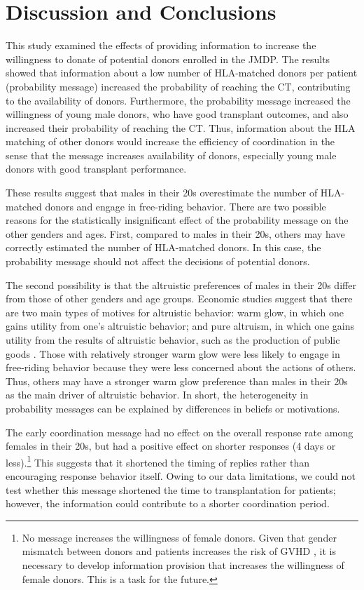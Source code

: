 \documentclass[12pt, a4paper]{article}
\begin{document}
\hypertarget{conclusion}{%
\section{Discussion and Conclusions}\label{conclusion}}

This study examined the effects of providing information to increase the willingness to donate of potential donors enrolled in the JMDP. The results showed that information about a low number of HLA-matched donors per patient (probability message) increased the probability of reaching the CT, contributing to the availability of donors. Furthermore, the probability message increased the willingness of young male donors, who have good transplant outcomes, and also increased their probability of reaching the CT. Thus, information about the HLA matching of other donors would increase the efficiency of coordination in the sense that the message increases availability of donors, especially young male donors with good transplant performance.

These results suggest that males in their 20s overestimate the number of HLA-matched donors and engage in free-riding behavior. There are two possible reasons for the statistically insignificant effect of the probability message on the other genders and ages. First, compared to males in their 20s, others may have correctly estimated the number of HLA-matched donors. In this case, the probability message should not affect the decisions of potential donors.

The second possibility is that the altruistic preferences of males in their 20s differ from those of other genders and age groups. Economic studies suggest that there are two main types of motives for altruistic behavior: warm glow, in which one gains utility from one's altruistic behavior; and pure altruism, in which one gains utility from the results of altruistic behavior, such as the production of public goods \citep{Andreoni1990}. Those with relatively stronger warm glow were less likely to engage in free-riding behavior because they were less concerned about the actions of others. Thus, others may have a stronger warm glow preference than males in their 20s as the main driver of altruistic behavior. In short, the heterogeneity in probability messages can be explained by differences in beliefs or motivations.

The early coordination message had no effect on the overall response rate among females in their 20s, but had a positive effect on shorter responses (4 days or less).\footnote{No message increases the willingness of female donors. Given that gender mismatch between donors and patients increases the risk of GVHD \citep{Loren2006, Nannya2011}, it is necessary to develop information provision that increases the willingness of female donors. This is a task for the future.} This suggests that it shortened the timing of replies rather than encouraging response behavior itself. Owing to our data limitations, we could not test whether this message shortened the time to transplantation for patients; however, the information could contribute to a shorter coordination period.
\end{document}
